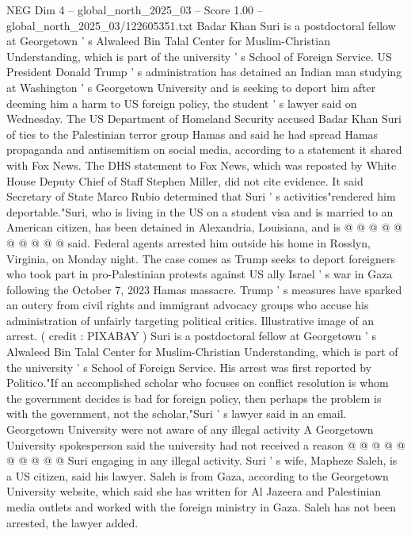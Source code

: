 \begin{textsample}{NEG Dim 4 – global\_north\_2025\_03 – Score 1.00 – global\_north\_2025\_03/122605351.txt}  \label{ex:f4_neg_394}
Badar Khan Suri is a postdoctoral fellow at Georgetown ' s Alwaleed Bin Talal Center for Muslim-Christian Understanding, which is part of the university ' s School of Foreign Service.
US President Donald Trump ' s administration has detained an Indian man studying at Washington ' s Georgetown University and is seeking to deport him after deeming him a harm to US foreign policy, the student ' s lawyer said on Wednesday.
The US Department of Homeland Security accused Badar Khan Suri of ties to the Palestinian terror group Hamas and said he had spread Hamas propaganda and antisemitism on social media, according to a statement it shared with Fox News.
The DHS statement to Fox News, which was reposted by White House Deputy Chief of Staff Stephen Miller, did not cite evidence.
It said Secretary of State Marco Rubio determined that Suri ' s activities"rendered him deportable."Suri, who is living in the US on a student visa and is married to an American citizen, has been detained in Alexandria, Louisiana, and is @ @ @ @ @ @ @ @ @ @ said.
Federal agents arrested him outside his home in Rosslyn, Virginia, on Monday night.
The case comes as Trump seeks to deport foreigners who took part in pro-Palestinian protests against US ally Israel ' s war in Gaza following the October 7, 2023 Hamas massacre.
Trump ' s measures have sparked an outcry from civil rights and immigrant advocacy groups who accuse his administration of unfairly targeting political critics.
Illustrative image of an arrest. ( credit : PIXABAY ) Suri is a postdoctoral fellow at Georgetown ' s Alwaleed Bin Talal Center for Muslim-Christian Understanding, which is part of the university ' s School of Foreign Service.
His arrest was first reported by Politico."If an accomplished scholar who focuses on conflict resolution is whom the government decides is bad for foreign policy, then perhaps the problem is with the government, not the scholar,"Suri ' s lawyer said in an email.
Georgetown University were not aware of any illegal activity A Georgetown University spokesperson said the university had not received a reason @ @ @ @ @ @ @ @ @ @ Suri engaging in any illegal activity.
Suri ' s wife, Mapheze Saleh, is a US citizen, said his lawyer.
Saleh is from Gaza, according to the Georgetown University website, which said she has written for Al Jazeera and Palestinian media outlets and worked with the foreign ministry in Gaza.
Saleh has not been arrested, the lawyer added.

\end{textsample}
